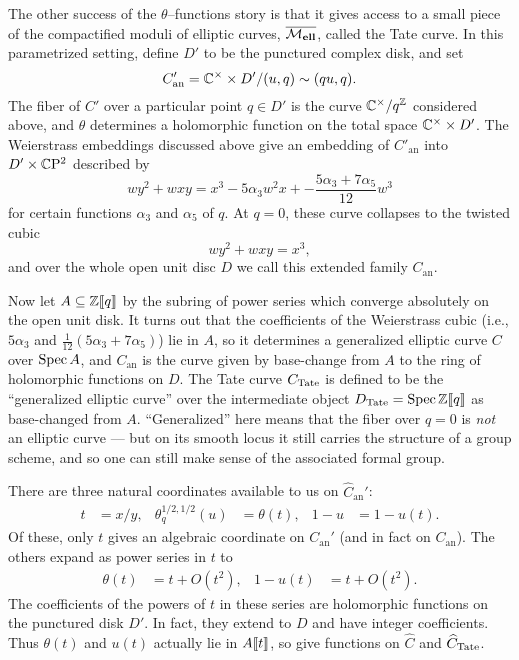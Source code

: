 The other success of the $\theta$--functions story is that it gives access to a small piece of the compactified moduli of elliptic curves, $\overline{\mathcal{M}_{\mathbf{ell}}}$, called the Tate curve.  In this parametrized setting, define $D'$ to be the punctured complex disk, and set \[C'_{\mathrm{an}} = \mathbb{C}^\times \times D' / (u, q) \sim (qu, q).\]  The fiber of $C'$ over a particular point $q \in D'$ is the curve $\mathbb{C}^\times / q^{\mathbb Z}$ considered above, and $\theta$ determines a holomorphic function on the total space $\mathbb{C}^\times \times D'$.  The Weierstrass embeddings discussed above give an embedding of $C'_{\mathrm{an}}$ into $D' \times \mathbb{C}\mathrm P^2$ described by \[wy^2 + wxy = x^3 - 5 \alpha_3 w^2 x + -\frac{5 \alpha_3 + 7 \alpha_5}{12}w^3\] for certain functions $\alpha_3$ and $\alpha_5$ of $q$.  At $q = 0$, these curve collapses to the twisted cubic \[wy^2 + wxy = x^3,\] and over the whole open unit disc $D$ we call this extended family $C_{\mathrm{an}}$.

Now let $A \subseteq \mathbb Z\llbracket{q}\rrbracket$ by the subring of power series which converge absolutely on the open unit disk.  It turns out that the coefficients of the Weierstrass cubic (i.e., $5\alpha_3$ and $\frac{1}{12}(5\alpha_3+7\alpha_5)$) lie in $A$, so it determines a generalized elliptic curve $C$ over $\operatorname{Spec} A$, and $C_{\mathrm{an}}$ is the curve given by base-change from $A$ to the ring of holomorphic functions on $D$.  The Tate curve $C_{\mathrm{Tate}}$ is defined to be the ``generalized elliptic curve'' over the intermediate object $D_{\mathrm{Tate}} = \operatorname{Spec} \mathbb Z\llbracket{q}\rrbracket$ as base-changed from $A$.  ``Generalized'' here means that the fiber over $q = 0$ is \emph{not} an elliptic curve --- but on its smooth locus it still carries the structure of a group scheme, and so one can still make sense of the associated formal group.

There are three natural coordinates available to us on $\widehat C_{\mathrm{an}}'$:
\begin{align*}
t & = x/y, &
\theta^{1/2,1/2}_q(u) & = \theta(t), &
1 - u & = 1 - u(t).
\end{align*}
Of these, only $t$ gives an algebraic coordinate on $C_{\mathrm{an}}'$ (and in fact on $C_{\mathrm{an}}$).  The others expand as power series in $t$ to
\begin{align*}
\theta(t) & = t + O(t^2), &
1 - u(t) & = t + O(t^2).
\end{align*}
The coefficients of the powers of $t$ in these series are holomorphic functions on the punctured disk $D'$.  In fact, they extend to $D$ and have integer coefficients.  Thus $\theta(t)$ and $u(t)$ actually lie in $A\llbracket{t}\rrbracket$, so give functions on $\widehat C$ and $\widehat C_{\mathrm{Tate}}$.

